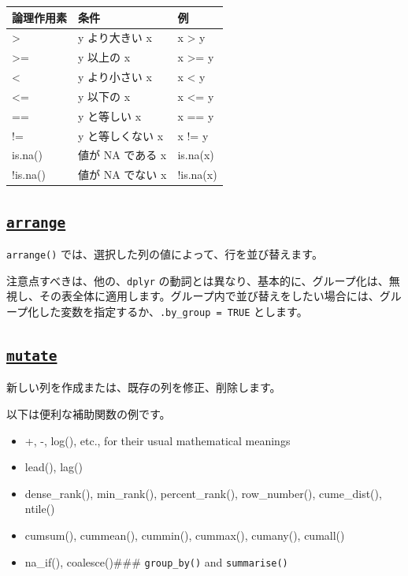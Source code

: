 \documentclass[
  xelatex, ja=standard]{bxjsbook}
\theoremstyle{definition}
\theoremstyle{definition}
\theoremstyle{definition}
\theoremstyle{definition}
\theoremstyle{remark}
\begin{document}
\begin{longtable}[]{@{}lll@{}}
\toprule\noalign{}
論理作用素 & 条件 & 例 \\
\midrule\noalign{}
\endhead
\bottomrule\noalign{}
\endlastfoot
\textgreater{} & y より大きい x & x \textgreater{} y \\
\textgreater= & y 以上の x & x \textgreater= y \\
\textless{} & y より小さい x & x \textless{} y \\
\textless= & y 以下の x & x \textless= y \\
== & y と等しい x & x == y \\
!= & y と等しくない x & x != y \\
is.na() & 値が NA である x & is.na(x) \\
!is.na() & 値が NA でない x & !is.na(x) \\
\end{longtable}

\hypertarget{arrange}{%
\subsection{\texorpdfstring{\href{https://dplyr.tidyverse.org/reference/arrange.html}{\texttt{arrange}}}{arrange}}\label{arrange}}

\texttt{arrange()} では、選択した列の値によって、行を並び替えます。

注意点すべきは、他の、\texttt{dplyr} の動詞とは異なり、基本的に、グループ化は、無視し、その表全体に適用します。グループ内で並び替えをしたい場合には、グループ化した変数を指定するか、\texttt{.by\_group\ =\ TRUE} とします。

\hypertarget{mutate}{%
\subsection{\texorpdfstring{\href{https://dplyr.tidyverse.org/reference/mutate.html}{\texttt{mutate}}}{mutate}}\label{mutate}}

新しい列を作成または、既存の列を修正、削除します。

以下は便利な補助関数の例です。

\begin{itemize}
\item
  +, -, log(), etc., for their usual mathematical meanings
\item
  lead(), lag()
\item
  dense\_rank(), min\_rank(), percent\_rank(), row\_number(), cume\_dist(), ntile()
\item
  cumsum(), cummean(), cummin(), cummax(), cumany(), cumall()
\item
  na\_if(), coalesce()\#\#\# \texttt{group\_by()} and \texttt{summarise()}
\end{itemize}
\end{document}
